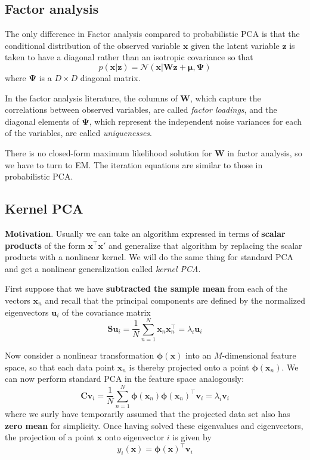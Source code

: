 \documentclass[a4paper]{report}
\renewcommand{\bf}{\mathbf}
\renewcommand{\cal}{\mathcal}
\newcommand{\imp}[1]{{\color{blue}\textit{#1}}}
\newcommand{\bs}{\boldsymbol}
\begin{document}
\subsection{Factor analysis}
The only difference in Factor analysis compared to probabilistic PCA is that the conditional distribution of the observed variable $\bf{x}$ given the latent variable $\bf{z}$ is taken to have a diagonal rather than an isotropic covariance so that
\begin{equation}
	p(\bf{x|z}) = \cal{N} (\bf{x}|\bf{Wz}+\bs{\mu},\bs{\Psi})
\end{equation}
where $\bs{\Psi}$ is a $D \times D$ diagonal matrix. 

In the factor analysis literature, the columns of $\bf{W}$, which capture the correlations between observed variables, are called \imp{factor loadings}, and the diagonal elements of $\bs{\Psi}$, which represent the independent noise variances for each of the variables, are called \imp{uniquenesses}.

There is no closed-form maximum likelihood solution for $\bf{W}$ in factor analysis, so we have to turn to EM. The iteration equations are similar to those in probabilistic PCA.
\subsection{Kernel PCA}
\textbf{Motivation}. Usually we can take an algorithm expressed in terms of \textbf{scalar products} of the form $\bf{x}^{\intercal} \bf{x'}$ and generalize that algorithm by replacing the scalar products with a nonlinear kernel. We will do the same thing for standard PCA and get a nonlinear generalization called \imp{kernel PCA}.

First suppose that we have \textbf{subtracted the sample mean} from each of the vectors $\bf{x}_n$ and recall that the principal components are defined by the normalized eigenvectors $\bf{u}_i$ of the covariance matrix
\begin{equation}
	\bf{Su}_i = \frac{1}{N} \sum_{n=1}^N \bf{x}_n\bf{x}_n^{\intercal} = \lambda_i \bf{u}_i
\end{equation}

Now consider a nonlinear transformation $\bs{\phi}(\bf{x})$ into an $M$-dimensional feature space, so that each data point $\bf{x}_n$ is thereby projected onto a point $\bs{\phi}(\bf{x}_n)$. We can now perform standard PCA in the feature space analogously:
\begin{equation}
	\bf{Cv}_i = \frac{1}{N}\sum_{n=1}^N \bs{\phi}(\bf{x}_n)\bs{\phi}(\bf{x}_n)^{\intercal} \bf{v}_i = \lambda_i \bf{v}_i \label{KPCA1}
\end{equation}
where we surly have temporarily assumed that the projected data set also has \textbf{zero mean} for simplicity. Once having solved these eigenvalues and eigenvectors, the projection of a point $\bf{x}$ onto eigenvector $i$ is given by
\begin{equation}
	y_i(\bf{x}) = \bs{\phi}(\bf{x})^{\intercal} \bf{v}_i
\end{equation}
\end{document}
